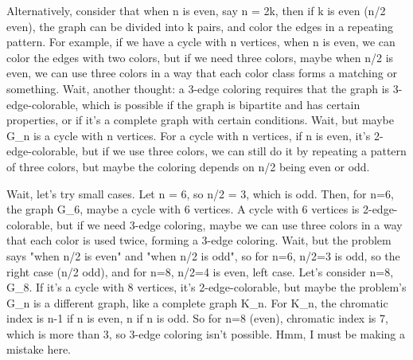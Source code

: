 Alternatively, consider that when n is even, say n = 2k, then if k is even (n/2 even), the graph can be divided into k pairs, and color the edges in a repeating pattern. For example, if we have a cycle with n vertices, when n is even, we can color the edges with two colors, but if we need three colors, maybe when n/2 is even, we can use three colors in a way that each color class forms a matching or something. Wait, another thought: a 3-edge coloring requires that the graph is 3-edge-colorable, which is possible if the graph is bipartite and has certain properties, or if it's a complete graph with certain conditions. Wait, but maybe G_n is a cycle with n vertices. For a cycle with n vertices, if n is even, it's 2-edge-colorable, but if we use three colors, we can still do it by repeating a pattern of three colors, but maybe the coloring depends on n/2 being even or odd.

Wait, let's try small cases. Let n = 6, so n/2 = 3, which is odd. Then, for n=6, the graph G_6, maybe a cycle with 6 vertices. A cycle with 6 vertices is 2-edge-colorable, but if we need 3-edge coloring, maybe we can use three colors in a way that each color is used twice, forming a 3-edge coloring. Wait, but the problem says "when n/2 is even" and "when n/2 is odd", so for n=6, n/2=3 is odd, so the right case (n/2 odd), and for n=8, n/2=4 is even, left case. Let's consider n=8, G_8. If it's a cycle with 8 vertices, it's 2-edge-colorable, but maybe the problem's G_n is a different graph, like a complete graph K_n. For K_n, the chromatic index is n-1 if n is even, n if n is odd. So for n=8 (even), chromatic index is 7, which is more than 3, so 3-edge coloring isn't possible. Hmm, I must be making a mistake here.

